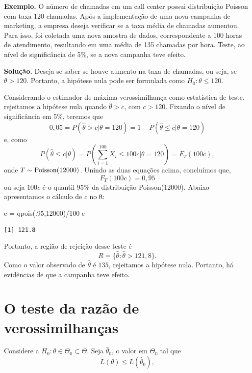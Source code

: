 \documentclass[
  letterpaper,
  DIV=11,
  numbers=noendperiod]{scrartcl}
\newenvironment{Shaded}{\begin{snugshade}}{\end{snugshade}}
\newcommand{\DecValTok}[1]{\textcolor[rgb]{0.68,0.00,0.00}{#1}}
\newcommand{\FunctionTok}[1]{\textcolor[rgb]{0.28,0.35,0.67}{#1}}
\newcommand{\NormalTok}[1]{\textcolor[rgb]{0.00,0.23,0.31}{#1}}
\newcommand{\OtherTok}[1]{\textcolor[rgb]{0.00,0.23,0.31}{#1}}
\newcommand{\SpecialCharTok}[1]{\textcolor[rgb]{0.37,0.37,0.37}{#1}}
\begin{document}
\textbf{Exemplo.} O número de chamadas em um call center possui
distribuição Poisson com taxa 120 chamadas. Após a implementação de uma
nova campanha de marketing, a empresa deseja verificar se a taxa média
de chamadas aumentou. Para isso, foi coletada uma nova amostra de dados,
correspondente a 100 horas de atendimento, resultando em uma média de
135 chamadas por hora. Teste, ao nível de significância de 5\%, se a
nova campanha teve efeito.

\textbf{Solução.} Deseja-se saber se houve aumento na taxa de chamadas,
ou seja, se \(\theta>120\). Portanto, a hipótese nula pode ser formulada
como \(H_0:\theta\leq 120\).

Considerando o estimador de máxima verossimilhança como estatística de
teste, rejeitamos a hipótese nula quando \(\hat{\theta}>c\), com
\(c>120\). Fixando o nível de significância em 5\%, teremos que
\[0,05=P(\hat{\theta}>c|\theta=120)=1-P(\hat{\theta}\leq c|\theta=120)\]
e, como
\[P(\hat{\theta}\leq c|\theta)=P\left(\sum_{i=1}^{100}X_i\leq 100c|\theta=120\right)=F_T(100c),\]
onde \(T\sim\hbox{Poisson}(12000)\). Unindo as duas equações acima,
concluímos que, \[F_T(100c)=0,95\] ou seja \(100c\) é o quantil 95\% da
distribuição Poisson(12000). Abaixo apresentamos o cálculo de \(c\) no
\texttt{R}:

\begin{Shaded}
\begin{Highlighting}[]
\NormalTok{c }\OtherTok{=} \FunctionTok{qpois}\NormalTok{(.}\DecValTok{95}\NormalTok{,}\DecValTok{12000}\NormalTok{)}\SpecialCharTok{/}\DecValTok{100}
\NormalTok{c}
\end{Highlighting}
\end{Shaded}

\begin{verbatim}
[1] 121.8
\end{verbatim}

Portanto, a região de rejeição desse teste é
\[R=\{\hat{\theta}:\hat{\theta}>121,8\}.\] Como o valor observado de
\(\hat{\theta}\) é \(135\), rejeitamos a hipótese nula. Portanto, há
evidências de que a campanha teve efeito.

\section{O teste da razão de
verossimilhanças}\label{o-teste-da-razuxe3o-de-verossimilhanuxe7as}

Considere a \(H_0:\theta\in\Theta_0\subset \Theta\). Seja
\(\hat{\theta}_0\), o valor em \(\Theta_0\) tal que \[\begin{equation}
L(\theta)\leq L(\hat{\theta}_0),
\end{equation}\]
\end{document}
